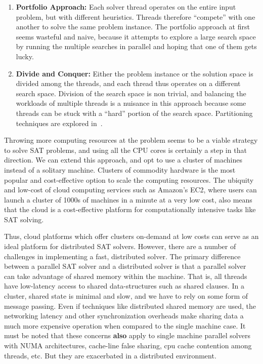 \documentclass{article}
\begin{document}
\begin{enumerate}
\item \textbf{Portfolio Approach: } Each solver thread operates on the
  entire input problem, but with different heuristics. Threads
  therefore ``compete'' with one another to solve the same problem
  instance. The portfolio approach at first seems wasteful and naive,
  because it attempts to explore a large search space by running the
  multiple searches in parallel and hoping that one of them gets
  lucky.

\item \textbf{Divide and Conquer: } Either the problem instance or the
  solution space is divided among the threads, and each thread thus
  operates on a different search space. Division of the search space
  is non trivial, and balancing the workloads of multiple threads is a
  nuisance in this approach because some threads can be stuck with a
  ``hard'' portion of the search space. Partitioning techniques are
  explored in~\cite{hyvarinen2010partitioning}.
\end{enumerate}



Throwing more computing resources at the problem seems to be a viable
strategy to solve SAT problems, and using all the CPU cores is
certainly a step in that direction. We can extend this approach, and
opt to use a cluster of machines instead of a solitary
machine. Clusters of commodity hardware is the most popular and
cost-effective option to scale the computing resources. The ubiquity
and low-cost of cloud computing services such as Amazon's EC2, where
users can launch a cluster of 1000s of machines in a minute at a very
low cost, also means that the cloud is a cost-effective platform for
computationally intensive tasks like SAT solving.



Thus, cloud platforms which offer clusters on-demand at low costs can
serve as an ideal platform for distributed SAT solvers. However, there
are a number of challenges in implementing a fast, distributed
solver. The primary difference between a parallel SAT solver and a
distributed solver is that a parallel solver can take advantage of
shared memory within the machine. That is, all threads have
low-latency access to shared data-structures such as shared
clauses. In a cluster, shared state is minimal and slow, and we have
to rely on some form of message passing. Even if techniques like
distributed shared memory are used, the networking latency and other
synchronization overheads make sharing data a much more expensive
operation when compared to the single machine case. It must be noted
that these concerns \textbf{also} apply to single machine parallel
solvers with NUMA architectures, cache-line false sharing, cpu cache
contention among threads, etc. But they are exacerbated in a
distributed environment.
\end{document}

